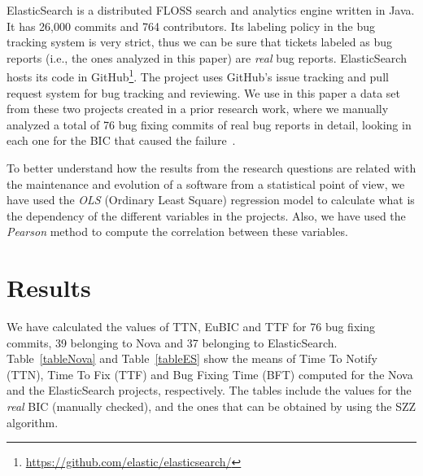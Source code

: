 \documentclass[10pt, conference]{IEEEtran}
\begin{document}
ElasticSearch is a distributed FLOSS search and analytics engine written in Java. It has 26,000 commits and 764 contributors. Its labeling policy in the bug tracking system is very strict, thus we can be sure that tickets labeled as bug reports (i.e., the ones analyzed in this paper) are \emph{real} bug reports. ElasticSearch hosts its code in GitHub\footnote{\url{https://github.com/elastic/elasticsearch/}}. The project uses GitHub's issue tracking and pull request system for bug tracking and reviewing.
We use in this paper a data set from these two projects created in a prior research work, where we manually analyzed a total of 76 bug fixing commits of real bug reports in detail, looking in each one for the BIC that caused the failure~\cite{gema2016doctoral}. %

To better understand how the results from the research questions are related with the maintenance and evolution of a software from a statistical point of view, we have used the \emph{OLS} (Ordinary Least Square) regression model to calculate what is the dependency of the different variables in the projects. Also, we have used the \emph{Pearson} method to compute the correlation between these variables.

\section{Results}
\label{sec:results}

We have calculated the values of TTN, EuBIC and TTF for 76 bug fixing commits, 39 belonging to Nova and 37 belonging to ElasticSearch. %
Table~\ref{tableNova} and Table~\ref{tableES} show the means of Time To Notify (TTN), Time To Fix (TTF) and Bug Fixing Time (BFT) computed for the Nova and the ElasticSearch projects, respectively. The tables include the values for the \emph{real} BIC (manually checked), and the ones that can be obtained by using the SZZ algorithm.
\end{document}
